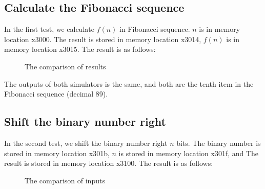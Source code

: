 \documentclass[UTF8,a4paper,12pt]{ctexart}
\begin{document}
\subsection{Calculate the Fibonacci sequence}

In the first test, we calculate $f(n)$ in Fibonacci sequence. $n$ is in memory location x3000. The result is stored in memory location x3014, $f(n)$ is in memory location x3015. The result is as follows:

\begin{figure}[H]   %
\centering
{}
 \hspace{0.2cm}      %
\centering
{}
\caption{The comparison of results}
\end{figure}

The outputs of both simulators is the same, and both are the tenth item in the Fibonacci sequence (decimal 89).

\subsection{Shift the binary number right}

In the second test, we shift the binary number right $n$ bits. The binary number is stored in memory location x301b,  $n$ is stored in memory location x301f, and The result is stored in memory location x3100. The result is as follows:

\begin{figure}[H]   %
\centering
{}
    \hspace{0.2cm}      %
\centering
{}
\caption{The comparison of inputs}
\end{figure}
\end{document}
